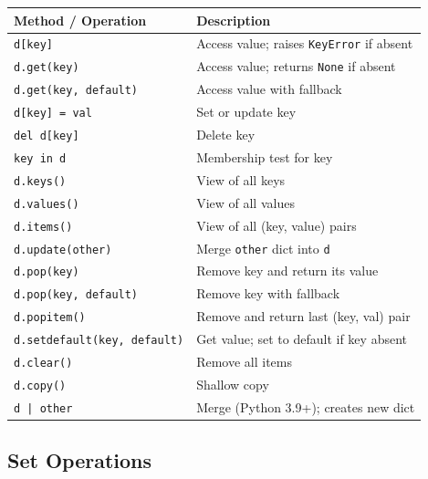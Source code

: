 \documentclass[oneside]{book}
\begin{document}
\begin{center}
\begin{tabularx}{\linewidth}{lX}
\toprule
\textbf{Method / Operation} & \textbf{Description} \\
\midrule
\texttt{d[key]}                     & Access value; raises \texttt{KeyError} if absent \\
\texttt{d.get(key)}                 & Access value; returns \texttt{None} if absent \\
\texttt{d.get(key, default)}        & Access value with fallback \\
\texttt{d[key] = val}               & Set or update key \\
\texttt{del d[key]}                 & Delete key \\
\texttt{key in d}                   & Membership test for key \\
\texttt{d.keys()}                   & View of all keys \\
\texttt{d.values()}                 & View of all values \\
\texttt{d.items()}                  & View of all (key, value) pairs \\
\texttt{d.update(other)}            & Merge \texttt{other} dict into \texttt{d} \\
\texttt{d.pop(key)}                 & Remove key and return its value \\
\texttt{d.pop(key, default)}        & Remove key with fallback \\
\texttt{d.popitem()}                & Remove and return last (key, val) pair \\
\texttt{d.setdefault(key, default)} & Get value; set to default if key absent \\
\texttt{d.clear()}                  & Remove all items \\
\texttt{d.copy()}                   & Shallow copy \\
\texttt{d | other}                  & Merge (Python 3.9+); creates new dict \\
\bottomrule
\end{tabularx}
\end{center}


\subsection*{Set Operations}
\end{document}
